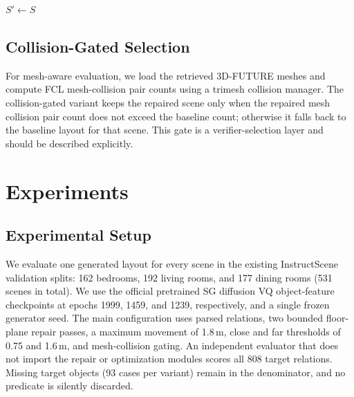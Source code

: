 \documentclass{article}
\newcommand{\fp}{Floor-Prior}
\begin{document}
\begin{algorithm}[t]
\caption{\fp{} relation repair}
\label{alg:floor-prior}
\DontPrintSemicolon
{}
$S' \leftarrow S$\;
\;
\end{algorithm}

\subsection{Collision-Gated Selection}

For mesh-aware evaluation, we load the retrieved 3D-FUTURE meshes and compute FCL mesh-collision pair counts using a trimesh collision manager. The collision-gated variant keeps the repaired scene only when the repaired mesh collision pair count does not exceed the baseline count; otherwise it falls back to the baseline layout for that scene. This gate is a verifier-selection layer and should be described explicitly.

\section{Experiments}

\subsection{Experimental Setup}

We evaluate one generated layout for every scene in the existing InstructScene validation splits: 162 bedrooms, 192 living rooms, and 177 dining rooms (531 scenes in total). We use the official pretrained SG diffusion VQ object-feature checkpoints at epochs 1999, 1459, and 1239, respectively, and a single frozen generator seed. The main configuration uses parsed relations, two bounded floor-plane repair passes, a maximum movement of 1.8\,m, close and far thresholds of 0.75 and 1.6\,m, and mesh-collision gating. An independent evaluator that does not import the repair or optimization modules scores all 808 target relations. Missing target objects (93 cases per variant) remain in the denominator, and no predicate is silently discarded.
\end{document}

